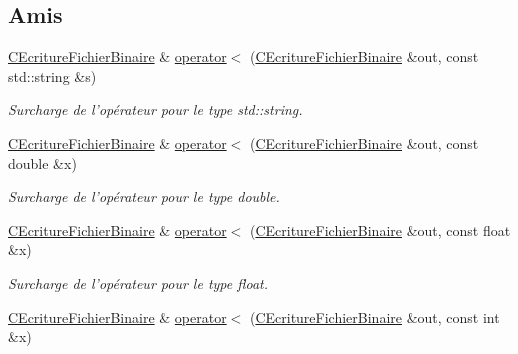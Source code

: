 \subsection*{Amis}
\begin{DoxyCompactItemize}
\item 
\hypertarget{class_c_ecriture_fichier_binaire_a2c88c30ff08c7d9035596e0187d44e45}{\hyperlink{class_c_ecriture_fichier_binaire}{C\-Ecriture\-Fichier\-Binaire} \& \hyperlink{class_c_ecriture_fichier_binaire_a2c88c30ff08c7d9035596e0187d44e45}{operator$<$} (\hyperlink{class_c_ecriture_fichier_binaire}{C\-Ecriture\-Fichier\-Binaire} \&out, const std\-::string \&s)}\label{class_c_ecriture_fichier_binaire_a2c88c30ff08c7d9035596e0187d44e45}

\begin{DoxyCompactList}\small\item\em Surcharge de l'opérateur pour le type {\itshape std\-::string}. \end{DoxyCompactList}\item 
\hypertarget{class_c_ecriture_fichier_binaire_afcaa555d19b37490df9fda731cf8cb19}{\hyperlink{class_c_ecriture_fichier_binaire}{C\-Ecriture\-Fichier\-Binaire} \& \hyperlink{class_c_ecriture_fichier_binaire_afcaa555d19b37490df9fda731cf8cb19}{operator$<$} (\hyperlink{class_c_ecriture_fichier_binaire}{C\-Ecriture\-Fichier\-Binaire} \&out, const double \&x)}\label{class_c_ecriture_fichier_binaire_afcaa555d19b37490df9fda731cf8cb19}

\begin{DoxyCompactList}\small\item\em Surcharge de l'opérateur pour le type {\itshape double}. \end{DoxyCompactList}\item 
\hypertarget{class_c_ecriture_fichier_binaire_a68e43a125ee6c25828485dfb7270fdea}{\hyperlink{class_c_ecriture_fichier_binaire}{C\-Ecriture\-Fichier\-Binaire} \& \hyperlink{class_c_ecriture_fichier_binaire_a68e43a125ee6c25828485dfb7270fdea}{operator$<$} (\hyperlink{class_c_ecriture_fichier_binaire}{C\-Ecriture\-Fichier\-Binaire} \&out, const float \&x)}\label{class_c_ecriture_fichier_binaire_a68e43a125ee6c25828485dfb7270fdea}

\begin{DoxyCompactList}\small\item\em Surcharge de l'opérateur pour le type {\itshape float}. \end{DoxyCompactList}\item 
\hypertarget{class_c_ecriture_fichier_binaire_a57ac55aefec2f3dd683cef75c409944b}{\hyperlink{class_c_ecriture_fichier_binaire}{C\-Ecriture\-Fichier\-Binaire} \& \hyperlink{class_c_ecriture_fichier_binaire_a57ac55aefec2f3dd683cef75c409944b}{operator$<$} (\hyperlink{class_c_ecriture_fichier_binaire}{C\-Ecriture\-Fichier\-Binaire} \&out, const int \&x)}\label{class_c_ecriture_fichier_binaire_a57ac55aefec2f3dd683cef75c409944b}


\end{DoxyCompactItemize}
